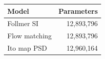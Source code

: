 \begin{tabular}{lr}
\toprule
Model & Parameters \\
\midrule
Follmer SI & 12,893,796 \\
Flow matching & 12,893,796 \\
Ito map PSD & 12,960,164 \\
\bottomrule
\end{tabular}
